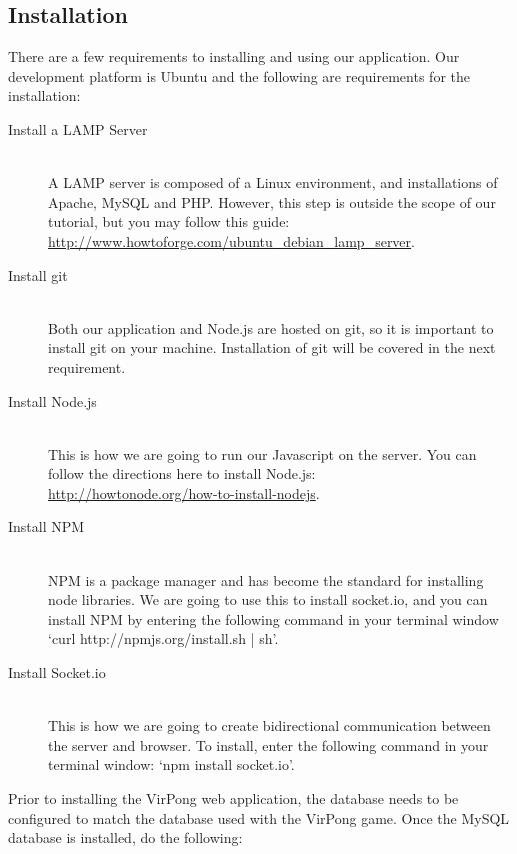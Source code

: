 %

	\subsection{Installation}
		There are a few requirements to installing and using our application. Our development platform is Ubuntu and the following are requirements for the installation:
		\begin{description}
			\item[Install a LAMP Server] \hfill \\
				A LAMP server is composed of a Linux environment, and installations of Apache, MySQL and PHP. However, this step is outside the scope of our tutorial, but you may follow this guide:\\\url{http://www.howtoforge.com/ubuntu_debian_lamp_server}.
			\item[Install git] \hfill \\
				Both our application and Node.js are hosted on git, so it is important to install git on your machine. Installation of git will be covered in the next requirement.
			\item[Install Node.js] \hfill \\
				This is how we are going to run our Javascript on the server. You can follow the directions here to install Node.js:\\ \url{http://howtonode.org/how-to-install-nodejs}.
			\item[Install NPM] \hfill \\
				NPM is a package manager and has become the standard for installing node libraries. We are going to use this to install socket.io, and you can install NPM by entering the following command in your terminal window `curl http://npmjs.org/install.sh | sh'.
			\item[Install Socket.io] \hfill \\
				This is how we are going to create bidirectional communication between the server and browser. To install, enter the following command in your terminal window: `npm install socket.io'.
		\end{description}
		Prior to installing the VirPong web application, the database needs to be configured to match the database used with the VirPong game. Once the MySQL database is installed, do the following:
